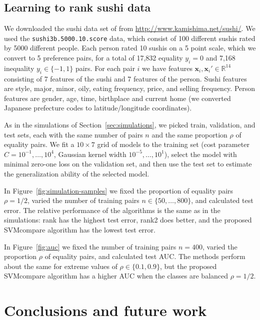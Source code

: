 \documentclass{article}
\newcommand{\RR}{\mathbb R}
\begin{document}
\subsection{Learning to rank sushi data}

We downloaded the sushi data set of \citet{object-ranking-methods}
from \url{http://www.kamishima.net/sushi/}. We used the
\texttt{sushi3b.5000.10.score} data, which consist of 100 different
sushis rated by 5000 different people. Each person rated 10 sushis on
a 5 point scale, which we convert to 5 preference pairs, for a total
of 17,832 equality $y_i=0$ and 7,168 inequality $y_i\in\{-1,1\}$
pairs. For each pair $i$ we have features $\mathbf x_i,\mathbf
x_i'\in\RR^{14}$ consisting of 7 features of the sushi and 7 features
of the person. Sushi features are style, major, minor, oily, eating
frequency, price, and selling frequency. Person features are gender, age,
time, birthplace and current home (we converted Japanese prefecture
codes to latitude/longitude coordinates).

As in the simulations of Section~\ref{sec:simulations}, we picked
train, validation, and test sets, each with the same number of pairs
$n$ and the same proportion $\rho$ of equality pairs. We fit a
$10\times 7$ grid of models to the training set (cost parameter
$C=10^{-1},\dots,10^4$, Gaussian kernel width $10^{-5},\dots,10^1$),
select the model with minimal zero-one loss on the validation set, and
then use the test set to estimate the generalization ability of the
selected model.

In Figure~\ref{fig:simulation-samples} we fixed the proportion of
equality pairs $\rho=1/2$, varied the number of training pairs
$n\in\{50,\dots, 800\}$, and calculated test error. The relative
performance of the algorithms is the same as in the simulations: rank
has the highest test error, rank2 does better, and the proposed
SVMcompare algorithm has the lowest test error.

In Figure~\ref{fig:auc} we fixed the number of training pairs $n=400$,
varied the proportion $\rho$ of equality pairs, and calculated test
AUC. The methods perform about the same for extreme values of
$\rho\in\{0.1,0.9\}$, but the proposed SVMcompare algorithm has a
higher AUC when the classes are balanced $\rho=1/2$.



\section{Conclusions and future work}
\label{sec:conclusions}
\end{document}
